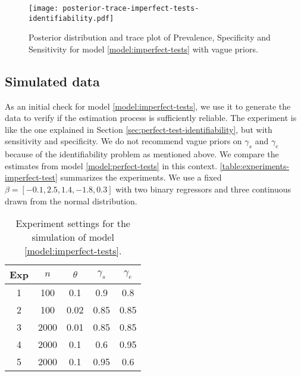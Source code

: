 \begin{figure}[ht]
  \centering
  \caption{\label{fig:posterior-trace-imperfect-tests-identifiability}Posterior
    distribution and trace plot of Prevalence, Specificity and Sensitivity for
    model \eqref{model:imperfect-tests} with vague priors.}
  \texttt{[image: posterior-trace-imperfect-tests-identifiability.pdf]}
\end{figure}

\subsection{Simulated data}

As an initial check for model \eqref{model:imperfect-tests}, we use it to
generate the data to verify if the estimation process is sufficiently
reliable. The experiment is like the one explained in Section
\ref{sec:perfect-test-identifiability}, but with sensitivity and specificity.
We do not recommend vague priors on $\gamma_s$ and $\gamma_e$ because of the
identifiability
problem as mentioned above. We compare the estimates from model
\eqref{model:perfect-tests} in this context. \autoref{table:experiments-imperfect-test} summarizes the
experiments. We use a fixed $\beta = [-0.1, 2.5, 1.4, -1.8, 0.3]$ with
two binary regressors and three continuous drawn from the normal distribution.

\begin{table}[!ht]
  \centering
  \caption{\label{table:experiments-imperfect-test}Experiment settings for the
    simulation of model \eqref{model:imperfect-tests}.}
  \begin{tabular}{ccccc}
    \hline
    Exp                   & $n$  & $\theta$ & $\gamma_s$ & $\gamma_e$ \\ \hline
    \multicolumn{1}{c}{1} & 100  & 0.1      & 0.9        & 0.8        \\
    \multicolumn{1}{c}{2} & 100  & 0.02     & 0.85       & 0.85       \\
    \multicolumn{1}{c}{3} & 2000 & 0.01     & 0.85       & 0.85       \\
    \multicolumn{1}{c}{4} & 2000 & 0.1      & 0.6        & 0.95       \\
    \multicolumn{1}{c}{5} & 2000 & 0.1      & 0.95       & 0.6        \\ \hline
  \end{tabular}
\end{table}

